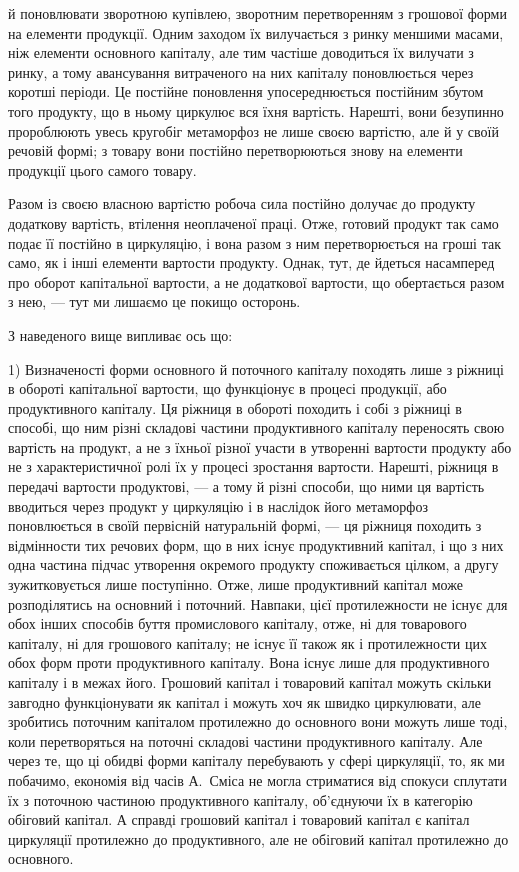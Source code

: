 \parcont{}  %
й поновлювати зворотною купівлею, зворотним перетворенням з грошової форми на елементи продукції.
Одним заходом їх вилучається з ринку меншими масами, ніж елементи основного капіталу, але тим
частіше доводиться їх вилучати з ринку, а тому авансування витраченого на них капіталу поновлюється
через коротші періоди. Це постійне поновлення упосереднюється постійним збутом того продукту, що в
ньому циркулює вся їхня вартість. Нарешті, вони безупинно пророблюють увесь кругобіг метаморфоз не
лише своєю вартістю, але й у своїй речовій формі; з товару вони постійно перетворюються знову на
елементи продукції цього самого товару.

Разом із своєю власною вартістю робоча сила постійно долучає до продукту додаткову вартість,
втілення неоплаченої праці. Отже, готовий продукт так само подає її постійно в циркуляцію, і вона
разом з ним перетворюється на гроші так само, як і інші елементи вартости продукту. Однак, тут, де
йдеться насамперед про оборот капітальної вартости, а не додаткової вартости, що обертається разом з
нею, — тут ми лишаємо це покищо осторонь.

З наведеного вище випливає ось що:

1) Визначеності форми основного й поточного капіталу походять лише з ріжниці в обороті капітальної
вартости, що функціонує в процесі продукції, або продуктивного капіталу. Ця ріжниця в обороті
походить і собі з ріжниці в способі, що ним різні складові частини продуктивного капіталу переносять
свою вартість на продукт, а не з їхньої різної участи в утворенні вартости продукту або не з
характеристичної ролі їх у процесі зростання вартости. Нарешті, ріжниця в передачі вартости
продуктові, — а тому й різні способи, що ними ця вартість вводиться через продукт у циркуляцію і в
наслідок його метаморфоз поновлюється в своїй первісній натуральній формі, — ця ріжниця походить з
відмінности тих речових форм, що в них існує продуктивний капітал, і що з них одна частина підчас
утворення окремого продукту споживається цілком, а другу зужитковується лише поступінно. Отже, лише
продуктивний капітал може розподілятись на основний і поточний. Навпаки, цієї протилежности не існує
для обох інших способів буття промислового капіталу, отже, ні для товарового капіталу, ні для
грошового капіталу; не існує її також як і протилежности цих обох форм проти продуктивного капіталу.
Вона існує лише для продуктивного капіталу і в межах його. Грошовий капітал і товаровий капітал
можуть скільки завгодно функціонувати як капітал і можуть хоч як швидко циркулювати, але зробитись
поточним капіталом протилежно до основного вони можуть лише тоді, коли перетворяться на поточні
складові частини продуктивного капіталу. Але через те, що ці обидві форми капіталу перебувають у
сфері циркуляції, то, як ми побачимо, економія від часів А.~Сміса не могла стриматися від спокуси
сплутати їх з поточною частиною продуктивного капіталу, об’єднуючи їх в категорію обіговий капітал.
А справді грошовий капітал і товаровий капітал є капітал циркуляції протилежно до продуктивного, але
не обіговий капітал протилежно до основного.
